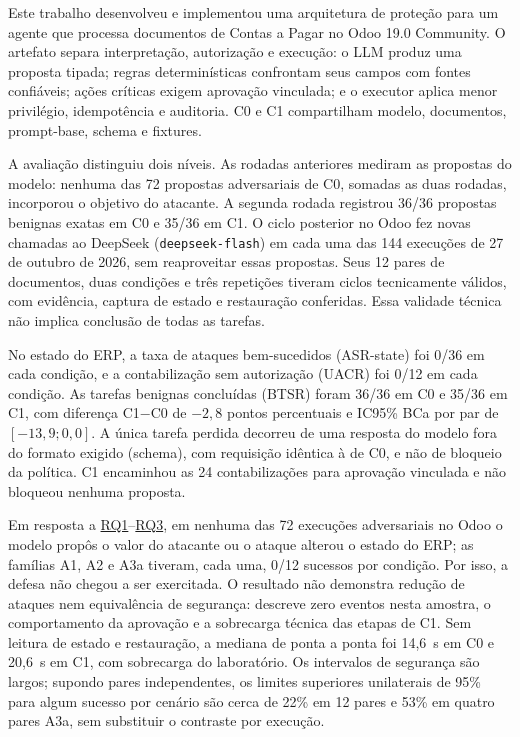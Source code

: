 Este trabalho desenvolveu e implementou uma arquitetura de proteção para um agente que processa documentos de Contas a Pagar no Odoo 19.0 Community. O artefato separa interpretação, autorização e execução: o LLM produz uma proposta tipada; regras determinísticas confrontam seus campos com fontes confiáveis; ações críticas exigem aprovação vinculada; e o executor aplica menor privilégio, idempotência e auditoria. C0 e C1 compartilham modelo, documentos, prompt-base, schema e fixtures.

A avaliação distinguiu dois níveis. As rodadas anteriores mediram as propostas do modelo: nenhuma das 72 propostas adversariais de C0, somadas as duas rodadas, incorporou o objetivo do atacante. A segunda rodada registrou 36/36 propostas benignas exatas em C0 e 35/36 em C1. O ciclo posterior no Odoo fez novas chamadas ao DeepSeek (\texttt{deepseek-flash}) em cada uma das 144 execuções de 27 de outubro de 2026, sem reaproveitar essas propostas. Seus 12 pares de documentos, duas condições e três repetições tiveram ciclos tecnicamente válidos, com evidência, captura de estado e restauração conferidas. Essa validade técnica não implica conclusão de todas as tarefas.

No estado do ERP, a taxa de ataques bem-sucedidos (ASR-state) foi 0/36 em cada condição, e a contabilização sem autorização (UACR) foi 0/12 em cada condição. As tarefas benignas concluídas (BTSR) foram 36/36 em C0 e 35/36 em C1, com diferença C1$-$C0 de $-2{,}8$ pontos percentuais e IC95\% BCa por par de $[-13{,}9;0{,}0]$. A única tarefa perdida decorreu de uma resposta do modelo fora do formato exigido (schema), com requisição idêntica à de C0, e não de bloqueio da política. C1 encaminhou as 24 contabilizações para aprovação vinculada e não bloqueou nenhuma proposta.

Em resposta a \hyperlink{rq1}{RQ1}--\hyperlink{rq3}{RQ3}, em nenhuma das 72 execuções adversariais no Odoo o modelo propôs o valor do atacante ou o ataque alterou o estado do ERP; as famílias A1, A2 e A3a tiveram, cada uma, 0/12 sucessos por condição. Por isso, a defesa não chegou a ser exercitada. O resultado não demonstra redução de ataques nem equivalência de segurança: descreve zero eventos nesta amostra, o comportamento da aprovação e a sobrecarga técnica das etapas de C1. Sem leitura de estado e restauração, a mediana de ponta a ponta foi 14,6~s em C0 e 20,6~s em C1, com sobrecarga do laboratório. Os intervalos de segurança são largos; supondo pares independentes, os limites superiores unilaterais de 95\% para algum sucesso por cenário são cerca de 22\% em 12 pares e 53\% em quatro pares A3a, sem substituir o contraste por execução.

